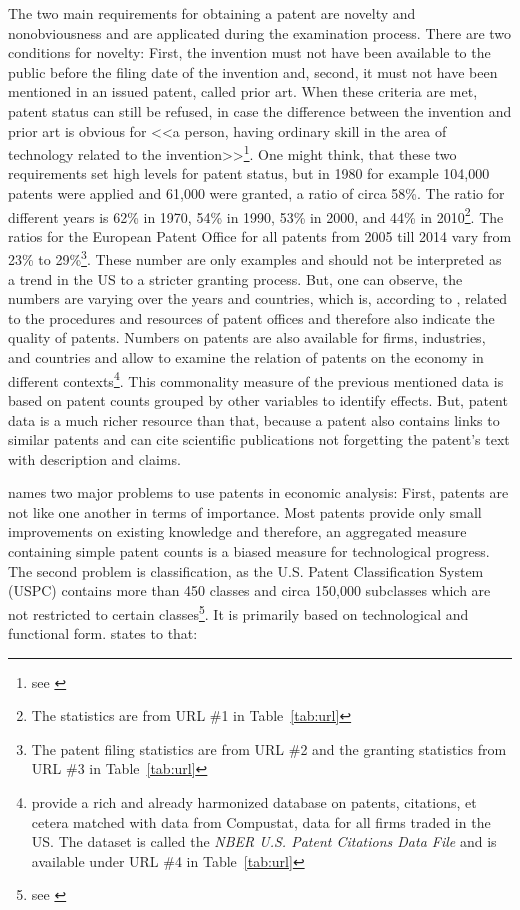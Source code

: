 \documentclass[12pt, a4paper]{scrartcl}
\theoremstyle{definition}
\begin{document}
The two main requirements for obtaining a patent are novelty and nonobviousness
and are applicated during the examination process. There are two conditions for
novelty: First, the invention must not have been available to the public before
the filing date of the invention and, second, it must not have been mentioned
in an issued patent, called prior art. When these criteria are met, patent
status can still be refused, in case the difference between the invention and
prior art is obvious for <<a person, having ordinary skill in the area of
technology related to the invention>>\footnote{see \cite{uspto2014patents}}.
One might think, that these two requirements set high levels for patent status,
but in 1980 for example 104,000 patents were applied and 61,000 were granted, a
ratio of circa 58\%. The ratio for different years is 62\% in 1970, 54\% in
1990, 53\% in 2000, and 44\% in 2010\footnote{The statistics are from URL \#1
in Table~\ref{tab:url}}. The ratios for the European Patent Office for all
patents from 2005 till 2014 vary from 23\% to 29\%\footnote{The patent filing
statistics are from URL \#2 and the granting statistics from URL \#3 in
Table~\ref{tab:url}}. These number are only examples and should not be
interpreted as a trend in the US to a stricter granting process. But, one can
observe, the numbers are varying over the years and countries, which is,
according to \citet{griliches1990patent}, related to the procedures and
resources of patent offices and therefore also indicate the quality of patents.
Numbers on patents are also available for firms, industries, and countries and
allow to examine the relation of patents on the economy in different
contexts\footnote{\cite{hall2001nber} provide a rich and already harmonized
database on patents, citations, et cetera matched with data from Compustat,
data for all firms traded in the US. The dataset is called the \textit{NBER
U.S. Patent Citations Data File} and is available under URL \#4 in
Table~\ref{tab:url}}. This commonality measure of the previous mentioned data
is based on patent counts grouped by other variables to identify effects. But,
patent data is a much richer resource than that, because a patent also contains
links to similar patents and can cite scientific publications not forgetting
the patent's text with description and claims.

\citet{griliches1990patent} names two major problems to use patents in economic
analysis: First, patents are not like one another in terms of importance. Most
patents provide only small improvements on existing knowledge and therefore, an
aggregated measure containing simple patent counts is a biased measure for
technological progress. The second problem is classification, as the U.S.
Patent Classification System (USPC) contains more than 450 classes and circa
150,000 subclasses which are not restricted to certain classes\footnote{see
\citet{uspto2012}}. It is primarily based on technological and functional form.
\citeauthor{schmookler1966invention} states to that:
\end{document}
